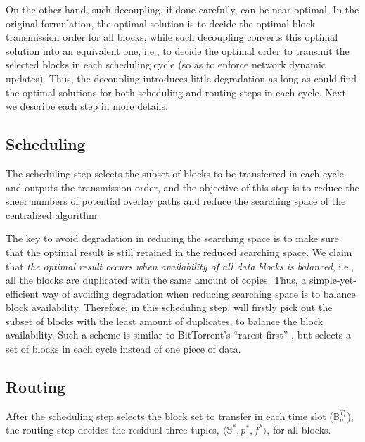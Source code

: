 On the other hand, such decoupling, if done carefully, can be near-optimal. In the original formulation, the optimal solution is to decide the optimal block transmission order for all blocks, while such decoupling converts this optimal solution into an equivalent one, i.e., to decide the optimal order to transmit the selected blocks in each scheduling cycle (so as to enforce network dynamic updates). Thus, the decoupling introduces little degradation as long as \name could find the optimal solutions for both scheduling and routing steps in each cycle. Next we describe each step in more details.


\subsection{Scheduling}
\label{subsec:logic:scheduling}

The scheduling step
selects the subset of blocks to be transferred in each cycle and
outputs the transmission order, and the objective of this step is to reduce the sheer numbers of potential overlay paths and reduce the searching space of the centralized algorithm.


The key to avoid degradation in reducing the searching space is to make sure that the optimal result is still retained in the reduced searching space. We claim that {\em the optimal result occurs when availability of all data blocks is balanced}, i.e., all the blocks are duplicated with the same amount of copies. Thus, a simple-yet-efficient way of avoiding degradation when reducing searching space is to balance block availability. Therefore, in this scheduling step, \name will firstly pick out the subset of blocks with the least amount of duplicates, to balance the block availability. Such a scheme is similar to BitTorrent's ``rarest-first'' \cite{Cohen2003Incentives}, but \name selects a set of blocks in each cycle instead of one piece of data.


\subsection{Routing}
\label{subsec:logic:routing}

After the scheduling step selects the block set to transfer in each time slot ($\mathbb{B}^{T_k}_n$), the routing step decides the residual three tuples, $\langle \mathbb{S}^*, p^*, f^* \rangle$, for all blocks.

